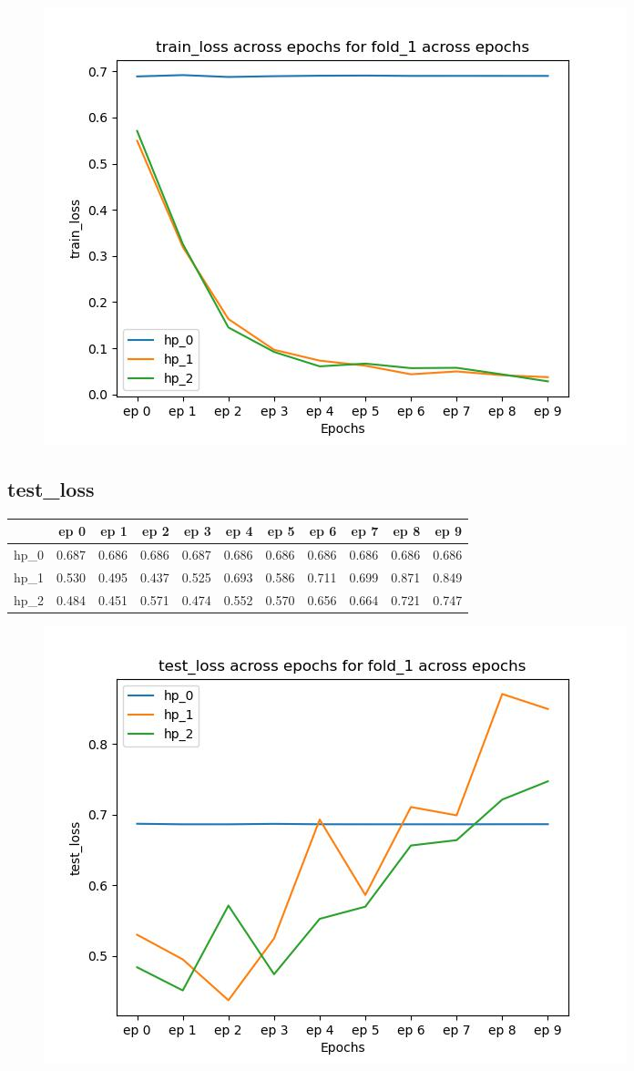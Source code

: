 \documentclass{article}
\begin{document}
\begin{figure}[H]
\includegraphics[scale = 0.75]{fold_1/train_loss}
\end{figure}
\subsection{test\_loss}
\begin{tabular}{lrrrrrrrrrr}
\toprule
{} &   ep 0 &   ep 1 &   ep 2 &   ep 3 &   ep 4 &   ep 5 &   ep 6 &   ep 7 &   ep 8 &   ep 9 \\
\midrule
hp\_0 &  0.687 &  0.686 &  0.686 &  0.687 &  0.686 &  0.686 &  0.686 &  0.686 &  0.686 &  0.686 \\
hp\_1 &  0.530 &  0.495 &  0.437 &  0.525 &  0.693 &  0.586 &  0.711 &  0.699 &  0.871 &  0.849 \\
hp\_2 &  0.484 &  0.451 &  0.571 &  0.474 &  0.552 &  0.570 &  0.656 &  0.664 &  0.721 &  0.747 \\
\bottomrule
\end{tabular}

\begin{figure}[H]
\includegraphics[scale = 0.75]{fold_1/test_loss}
\end{figure}
\end{document}
